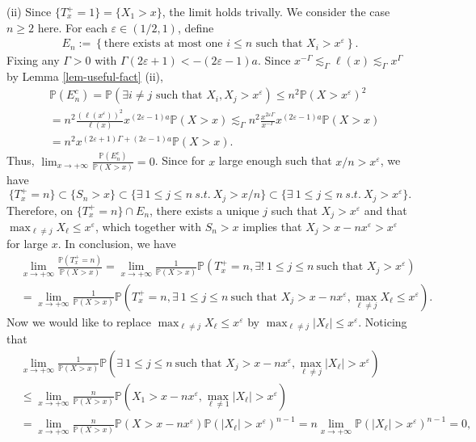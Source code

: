 \documentclass[10pt,a4paper]{amsart}
\numberwithin{equation}{section}
\begin{document}
 (ii) Since $\{T_x^+=1\}= \{X_1>x\}$, the limit holds trivally. We consider the case $n\geq 2$ here. 
 For each $\varepsilon\in (1/2,1)$, define 
 \begin{align}\label{def-of-E-n}
 E_n:= \left\{ \mbox{there exists at most one }i \leq n \mbox{ such that } X_i>x^\varepsilon \right\}.
 \end{align}
 Fixing any $\Gamma>0$ with $\Gamma(2\varepsilon+1)<-(2\varepsilon-1)a$. Since $x^{-\Gamma}\lesssim_\Gamma \ell(x)\lesssim_\Gamma x^\Gamma$ by Lemma \ref{lem-useful-fact} (ii),  
 \begin{align}\label{e4'}
 & \mathbb{P}\left(E_n^c\right) =\mathbb{P}\left(\exists i\neq j \mbox{ such that } X_i, X_j>x^\varepsilon \right)\leq n^2 \mathbb{P}(X>x^\varepsilon)^2 \nonumber\\
 &= n^2\frac{\left(\ell(x^\varepsilon)\right)^2}{\ell(x)} x^{(2\varepsilon-1)a}  \mathbb{P}(X>x) \lesssim_\Gamma n^2\frac{x^{2\varepsilon \Gamma}}{x^{-\Gamma}} x^{(2\varepsilon-1)a}  \mathbb{P}(X>x) \nonumber\\
 & = n^{2} x^{(2\varepsilon+1)\Gamma +(2\varepsilon-1)a} \mathbb{P}(X>x). 
 \end{align}
 Thus,    $\lim_{x\to +\infty} \frac{\mathbb{P}(E_n^c)}{\mathbb{P}(X>x)} =0$. 
 Since for $x$ large enough such that $x/n>x^{\varepsilon}$,  we have
 \[
 \{T_x^+=n\}\subset \{S_n>x\}\subset \{\exists\ 1\leq j\leq n\ s.t.\ X_j>x/n \}\subset \{\exists\ 1\leq j\leq n\ s.t.\ X_j>x^{\varepsilon} \}.
 \]
 Therefore, on $\{T_x^+=n\}\cap E_n$, there exists a unique $j$ such that $X_j>x^\varepsilon$ and that $\max_{\ell\neq j} X_\ell \leq x^{\varepsilon}$, which together with $S_n >x$ implies that $X_j> x-nx^\varepsilon>x^\varepsilon$ for large $x$. In conclusion, we have  
\begin{align}\label{e4}
	& \lim_{x\to +\infty} \frac{\mathbb{P}(T_x^+ =n)}{\mathbb{P}(X>x)}   =\lim_{x\to +\infty} \frac{1}{\mathbb{P}(X>x)}\mathbb{P}\left(T_x^+=n, \exists !\ 1\leq j\leq n\ \mbox{such that } X_j>x^\varepsilon \right) \nonumber\\
	&= \lim_{x\to +\infty} \frac{1}{\mathbb{P}(X>x)} \mathbb{P}\left(T_x^+=n, \exists \ 1\leq j\leq n\ \mbox{such that } X_j>x- nx^\varepsilon, \max_{\ell\neq j} X_\ell \leq x^\varepsilon \right). 
\end{align}
Now we would like to replace $\max_{\ell\neq j} X_\ell \leq x^\varepsilon $ by $\max_{\ell\neq j} |X_\ell| \leq x^\varepsilon $. Noticing that 
\begin{align}\label{e11-3}
	 & \lim_{x\to +\infty} \frac{1}{\mathbb{P}(X>x)}\mathbb{P}\left(\exists \ 1\leq j\leq n\ \mbox{such that } X_j>x- nx^\varepsilon, \max_{\ell\neq j} |X_\ell| > x^\varepsilon \right) \nonumber\\
	 &\leq \lim_{x\to +\infty} \frac{n}{\mathbb{P}(X>x)} \mathbb{P}\left(X_1>x- nx^\varepsilon, \max_{\ell\neq 1} |X_\ell| > x^\varepsilon \right)\nonumber\\
	 &=  \lim_{x\to +\infty} \frac{n}{\mathbb{P}(X>x)}\mathbb{P}\left(X>x- nx^\varepsilon\right)\mathbb{P}\left(  |X_\ell| > x^\varepsilon \right)^{n-1} = n \lim_{x\to +\infty} \mathbb{P}\left(  |X_\ell| > x^\varepsilon \right)^{n-1}  =0,
\end{align}
\end{document}
